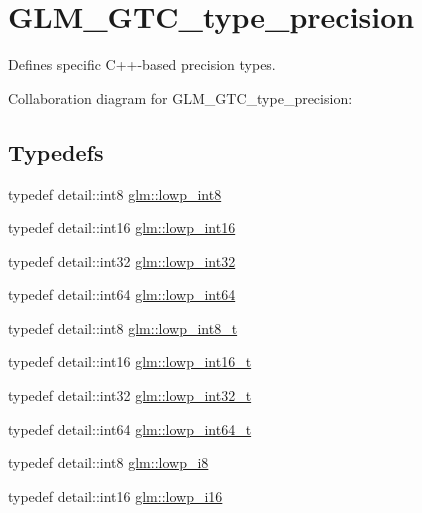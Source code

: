 \hypertarget{group__gtc__type__precision}{\section{G\-L\-M\-\_\-\-G\-T\-C\-\_\-type\-\_\-precision}
\label{group__gtc__type__precision}
}


Defines specific C++-\/based precision types.  


Collaboration diagram for G\-L\-M\-\_\-\-G\-T\-C\-\_\-type\-\_\-precision\-:
\subsection*{Typedefs}
\begin{DoxyCompactItemize}
\item 
typedef detail\-::int8 \hyperlink{group__gtc__type__precision_gaf9e675b6392764242ae87eb179e9d3d6}{glm\-::lowp\-\_\-int8}
\item 
typedef detail\-::int16 \hyperlink{group__gtc__type__precision_ga71fc0c399fa4780507748b643733f153}{glm\-::lowp\-\_\-int16}
\item 
typedef detail\-::int32 \hyperlink{group__gtc__type__precision_gad9939c9d6fec1c6accc02a83c6500f08}{glm\-::lowp\-\_\-int32}
\item 
typedef detail\-::int64 \hyperlink{group__gtc__type__precision_gab8a8e75af347592406e41b3ae2c0712b}{glm\-::lowp\-\_\-int64}
\item 
typedef detail\-::int8 \hyperlink{group__gtc__type__precision_gae6092311f6970a305c2df19a372360a3}{glm\-::lowp\-\_\-int8\-\_\-t}
\item 
typedef detail\-::int16 \hyperlink{group__gtc__type__precision_gae34c3d53c4c1434fc9f26538b0185667}{glm\-::lowp\-\_\-int16\-\_\-t}
\item 
typedef detail\-::int32 \hyperlink{group__gtc__type__precision_gad9567c806dc39f534174eef42663119d}{glm\-::lowp\-\_\-int32\-\_\-t}
\item 
typedef detail\-::int64 \hyperlink{group__gtc__type__precision_ga14d72e76d57c7f28eca8e933816c9fd6}{glm\-::lowp\-\_\-int64\-\_\-t}
\item 
typedef detail\-::int8 \hyperlink{group__gtc__type__precision_gaa2e13ee29c90f75658beed6082541097}{glm\-::lowp\-\_\-i8}
\item 
typedef detail\-::int16 \hyperlink{group__gtc__type__precision_gaf7bbfd31bcec25a416ea94d09efb5451}{glm\-::lowp\-\_\-i16}
\item 

\end{DoxyCompactItemize}
